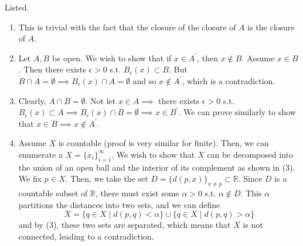     \begin{solution}
    Listed. 
    \begin{enumerate}
        \item This is trivial with the fact that the closure of the closure of $A$ is the closure of $A$. 
        \item Let $A, B$ be open. We wish to show that if $x \in A^\prime$, then $x \not\in B$. Assume $x \in B$. Then there exists $\epsilon > 0$ s.t. $B_\epsilon (x) \subset B$. But $B \cap A = \emptyset \implies B_\epsilon (x) \cap A = \emptyset$ and so $x \not\in A^\prime$, which is a contradiction. 

        \item Clearly, $A \cap B = \emptyset$. Not let $x \in A \implies$ there exists $\epsilon > 0$ s.t. $B_\epsilon (x) \subset A \implies B_\epsilon (x) \cap B = \emptyset \implies x \in B^\prime$. We can prove similarly to show that $x \in B \implies x \not\in A^\prime$. 

        \item Assume $X$ is countable (proof is very similar for finite). Then, we can enumerate a $X = \{x_i\}_{i=1}^\infty$. We wish to show that $X$ can be decomposed into the union of an open ball and the interior of its complement as shown in (3). We fix $p \in X$. Then, we take the set $D = \{d(p, x)\}_{x \neq p} \subset \mathbb{R}$. Since $D$ is a countable subset of $\mathbb{R}$, there must exist some $\alpha > 0$ s.t. $\alpha \not\in D$. This $\alpha$ partitions the distances into two sets, and we can define 
        \[X = \{q \in X \mid d(p, q) < \alpha\} \cup \{q \in X \mid d(p, q) > \alpha\}\]
        and by (3), these two sets are separated, which means that $X$ is not connected, leading to a contradiction. 
    \end{enumerate}
    \end{solution}

